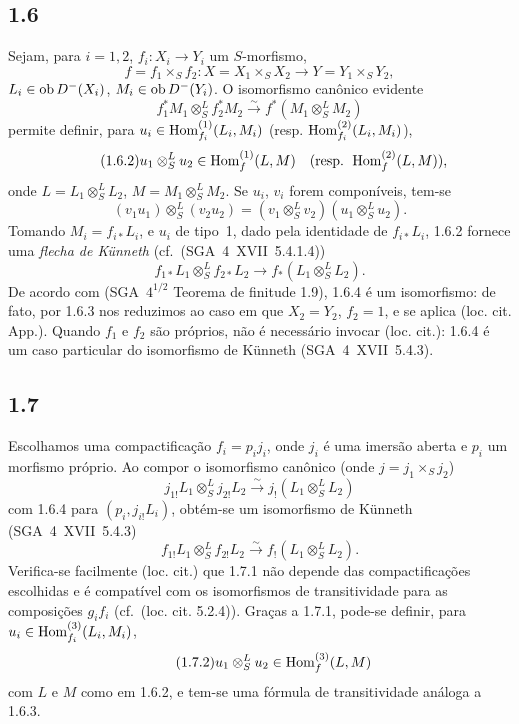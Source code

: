 \subsection*{1.6}
Sejam, para $i=1,2$, $f_i:X_i\to Y_i$ um $S$-morfismo,
\[
f=f_1\times_S f_2:X=X_1\times_S X_2\to Y=Y_1\times_S Y_2,
\]
$L_i\in\operatorname{ob} D^{-}(X_i)$, $M_i\in\operatorname{ob} D^{-}(Y_i)$. O isomorfismo canônico evidente
\begin{equation}\tag{1.6.1}
f_1^{*}M_1\otimes^{L}_{S}f_2^{*}M_2\xrightarrow{\sim}f^{*}(M_1\otimes^{L}_{S}M_2)
\end{equation}
permite definir, para $u_i\in\operatorname{Hom}_{f_i}^{(1)}(L_i,M_i)$ (resp. $\operatorname{Hom}_{f_i}^{(2)}(L_i,M_i)$),
\begin{equation}\tag{1.6.2}
u_1\otimes^{L}_{S}u_2\in\operatorname{Hom}_{f}^{(1)}(L,M)\quad(\text{resp. }\operatorname{Hom}_f^{(2)}(L,M)),
\end{equation}
onde $L=L_1\otimes^{L}_{S}L_2$, $M=M_1\otimes^{L}_{S}M_2$. Se $u_i$, $v_i$ forem componíveis, tem-se
\begin{equation}\tag{1.6.3}
(v_1u_1)\otimes^{L}_{S}(v_2u_2)=(v_1\otimes^{L}_{S}v_2)(u_1\otimes^{L}_{S}u_2).
\end{equation}
Tomando $M_i=f_{i*}L_i$, e $u_i$ de tipo~1, dado pela identidade de $f_{i*}L_i$, 1.6.2 fornece uma \emph{flecha de Künneth} (cf.~(SGA~4~XVII~5.4.1.4))
\begin{equation}\tag{1.6.4}
f_{1*}L_1\otimes^{L}_{S}f_{2*}L_2\longrightarrow f_{*}(L_1\otimes^{L}_{S}L_2).
\end{equation}
De acordo com (SGA~$4^{1/2}$ Teorema de finitude 1.9), 1.6.4 é um isomorfismo: de fato, por 1.6.3 nos reduzimos ao caso em que $X_2=Y_2$, $f_2=1$, e se aplica (loc. cit. App.). Quando $f_1$ e $f_2$ são próprios, não é necessário invocar (loc. cit.): 1.6.4 é um caso particular do isomorfismo de Künneth (SGA~4~XVII~5.4.3).

\subsection*{1.7}
Escolhamos uma compactificação $f_i=p_i j_i$, onde $j_i$ é uma imersão aberta e $p_i$ um morfismo próprio. Ao compor o isomorfismo canônico (onde $j=j_1\times_S j_2$)
\[
j_{1!}L_1\otimes^{L}_{S}j_{2!}L_2\xrightarrow{\sim}j_{!}(L_1\otimes^{L}_{S}L_2)
\]
com 1.6.4 para $(p_i,j_{i!}L_i)$, obtém-se um isomorfismo de Künneth (SGA~4~XVII~5.4.3)
\begin{equation}\tag{1.7.1}
f_{1!}L_1\otimes^{L}_{S}f_{2!}L_2\xrightarrow{\sim}f_{!}(L_1\otimes^{L}_{S}L_2).
\end{equation}
Verifica-se facilmente (loc. cit.) que 1.7.1 não depende das compactificações escolhidas e é compatível com os isomorfismos de transitividade para as composições $g_if_i$ (cf.~(loc. cit. 5.2.4)). Graças a 1.7.1, pode-se definir, para $u_i\in\operatorname{Hom}_{f_i}^{(3)}(L_i,M_i)$,
\begin{equation}\tag{1.7.2}
u_1\otimes^{L}_{S}u_2\in\operatorname{Hom}_f^{(3)}(L,M)
\end{equation}
com $L$ e $M$ como em 1.6.2, e tem-se uma fórmula de transitividade análoga a 1.6.3.

